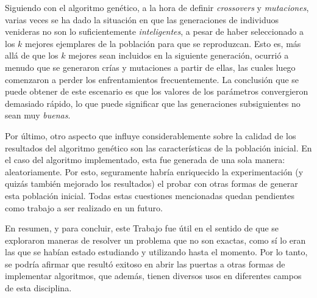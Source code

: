 \documentclass[12pt,a4paper]{article}
\begin{document}
Siguiendo con el algoritmo genético, a la hora de definir \textit{crossovers} y \textit{mutaciones}, varias veces se ha dado la situación en que las generaciones de individuos venideras no son lo suficientemente \textit{inteligentes}, a pesar de haber seleccionado a los $k$ mejores ejemplares de la población para que se reproduzcan. Esto es, más allá de que los $k$ mejores sean incluidos en la siguiente generación, ocurrió a menudo que se generaron crías y mutaciones a partir de ellas, las cuales luego comenzaron a perder los enfrentamientos frecuentemente. La conclusión que se puede obtener de este escenario es que los valores de los parámetros convergieron demasiado rápido, lo que puede significar que las generaciones subsiguientes no sean muy \textit{buenas}.

Por último, otro aspecto que influye considerablemente sobre la calidad de los resultados del algoritmo genético son las características de la población inicial. En el caso del algoritmo implementado, esta fue generada de una sola manera: aleatoriamente. Por esto, seguramente habría enriquecido la experimentación (y quizás también mejorado los resultados) el probar con otras formas de generar esta población inicial. Todas estas cuestiones mencionadas quedan pendientes como trabajo a ser realizado en un futuro.

En resumen, y para concluir, este Trabajo fue útil en el sentido de que se exploraron maneras de resolver un problema que no son exactas, como sí lo eran las que se habían estado estudiando y utilizando hasta el momento. Por lo tanto, se podría afirmar que resultó exitoso en abrir las puertas a otras formas de implementar algoritmos, que además, tienen diversos usos en diferentes campos de esta disciplina.







\end{document}
